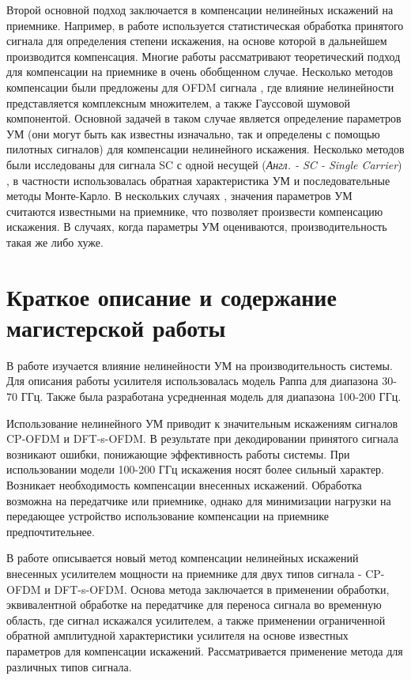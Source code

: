 \documentclass{unn}
\begin{document}
Второй основной подход заключается в компенсации нелинейных искажений на
приемнике. Например, в работе \cite{maltsev2021} используется
статистическая обработка принятого сигнала для определения степени
искажения, на основе которой в дальнейшем производится компенсация. Многие
работы \cite[]{sharath2015, shabany2008,bhat2016,qi2010,gregorio2007,
bouhadda2015,drotar2010} рассматривают теоретический подход для компенсации
на приемнике в очень обобщенном случае. Несколько методов компенсации были
предложены для OFDM сигнала \cite[]{gregorio2007,bouhadda2015, drotar2010},
где влияние нелинейности представляется комплексным множителем, а также
Гауссовой шумовой компонентой. Основной задачей в таком случае является
определение параметров УМ (они могут быть как известны изначально, так и
определены с помощью пилотных сигналов) для компенсации нелинейного
искажения. Несколько методов были исследованы для сигнала SC с одной несущей
(\textit{Англ. - SC - Single Carrier}) \cite[]{sharath2015,
shabany2008,bhat2016, qi2010}, в частности использовалась обратная
характеристика УМ и последовательные методы Монте-Карло. В нескольких
случаях \cite[]{bhat2016, qi2010,gregorio2007}, значения параметров УМ
считаются известными на приемнике, что позволяет произвести компенсацию
искажения. В случаях, когда параметры УМ оцениваются, производительность
такая же либо хуже.

\section{Краткое описание и содержание магистерской работы}
В работе изучается влияние нелинейности УМ на производительность
системы. Для описания работы усилителя использовалась модель Раппа для
диапазона 30-70 ГГц. Также была разработана усредненная модель для
диапазона 100-200 ГГц. 

Использование нелинейного УМ приводит к значительным искажениям сигналов
CP-OFDM и DFT-s-OFDM. В результате при декодировании принятого сигнала
возникают ошибки, понижающие эффективность работы системы. При
использовании модели 100-200 ГГц искажения носят более сильный характер.
Возникает необходимость компенсации внесенных искажений. Обработка возможна
на передатчике или приемнике, однако для минимизации нагрузки на передающее
устройство использование компенсации на приемнике предпочтительнее.

В работе описывается новый метод компенсации нелинейных искажений внесенных
усилителем мощности на приемнике для двух типов сигнала - CP-OFDM и
DFT-s-OFDM. Основа метода заключается в применении обработки, эквивалентной
обработке на передатчике для переноса сигнала во временную область, где
сигнал искажался усилителем, а также применении ограниченной обратной
амплитудной характеристики усилителя на основе известных параметров для
компенсации искажений. Рассматривается применение метода для различных
типов сигнала.
\end{document}

